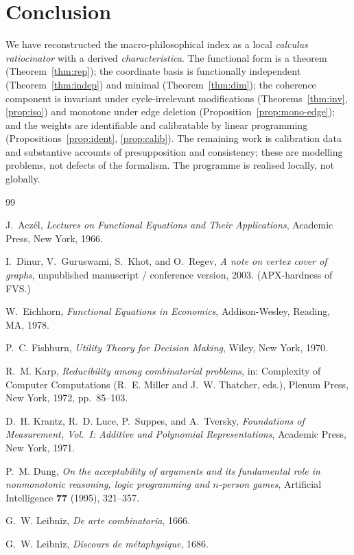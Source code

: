 \documentclass[11pt]{article}
\theoremstyle{definition}
\theoremstyle{remark}
\begin{document}
\section{Conclusion}\label{sec:concl}

We have reconstructed the macro-philosophical index as a local \emph{calculus ratiocinator} with a derived \emph{characteristica}. The functional form is a theorem (Theorem~\ref{thm:rep}); the coordinate basis is functionally independent (Theorem~\ref{thm:indep}) and minimal (Theorem~\ref{thm:dim}); the coherence component is invariant under cycle-irrelevant modifications (Theorems~\ref{thm:inv}, \ref{prop:iso}) and monotone under edge deletion (Proposition~\ref{prop:mono-edge}); and the weights are identifiable and calibratable by linear programming (Propositions~\ref{prop:ident}, \ref{prop:calib}). The remaining work is calibration data and substantive accounts of presupposition and consistency; these are modelling problems, not defects of the formalism. The programme is realised locally, not globally.

\begin{thebibliography}{99}

J.~Acz\'el,
\emph{Lectures on Functional Equations and Their Applications},
Academic Press, New York, 1966.

I.~Dinur, V.~Guruswami, S.~Khot, and O.~Regev,
\emph{A note on vertex cover of graphs},
unpublished manuscript / conference version, 2003. (APX-hardness of FVS.)

W.~Eichhorn,
\emph{Functional Equations in Economics},
Addison-Wesley, Reading, MA, 1978.

P.~C. Fishburn,
\emph{Utility Theory for Decision Making},
Wiley, New York, 1970.

R.~M. Karp,
\emph{Reducibility among combinatorial problems},
in: Complexity of Computer Computations (R.~E. Miller and J.~W. Thatcher, eds.),
Plenum Press, New York, 1972, pp.~85--103.

D.~H. Krantz, R.~D. Luce, P.~Suppes, and A.~Tversky,
\emph{Foundations of Measurement, Vol.~I: Additive and Polynomial Representations},
Academic Press, New York, 1971.

P.~M. Dung,
\emph{On the acceptability of arguments and its fundamental role in nonmonotonic reasoning, logic programming and $n$-person games},
Artificial Intelligence \textbf{77} (1995), 321--357.

G.~W. Leibniz,
\emph{De arte combinatoria}, 1666.

G.~W. Leibniz,
\emph{Discours de m\'etaphysique}, 1686.

\end{thebibliography}
\end{document}
